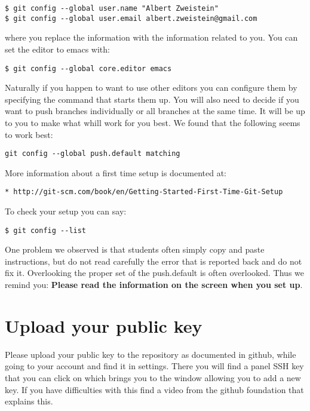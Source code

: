 \begin{verbatim}
$ git config --global user.name "Albert Zweistein"
$ git config --global user.email albert.zweistein@gmail.com
\end{verbatim}

where you replace the information with the information related to you.
You can set the editor to emacs with:

\begin{verbatim}
$ git config --global core.editor emacs
\end{verbatim}

Naturally if you happen to want to use other editors you can configure
them by specifying the command that starts them up. You will also need
to decide if you want to push branches individually or all branches at
the same time. It will be up to you to make what whill work for you
best. We found that the following seems to work best:

\begin{verbatim}
git config --global push.default matching
\end{verbatim}

More information about a first time setup is documented at:

\begin{verbatim}
* http://git-scm.com/book/en/Getting-Started-First-Time-Git-Setup
\end{verbatim}

To check your setup you can say:

\begin{verbatim}
$ git config --list
\end{verbatim}

One problem we observed is that students often simply copy and paste
instructions, but do not read carefully the error that is reported
back and do not fix it. Overlooking the proper set of the push.default
is often overlooked. Thus we remind you: {\bf Please read the
  information on the screen when you set up}.

\section{Upload your public key}\label{upload-your-public-key}

Please upload your public key to the repository as documented in
github, while going to your account and find it in settings. There you
will find a panel SSH key that you can click on which brings you to
the window allowing you to add a new key. If you have difficulties
with this find a video from the github foundation that explains this.

